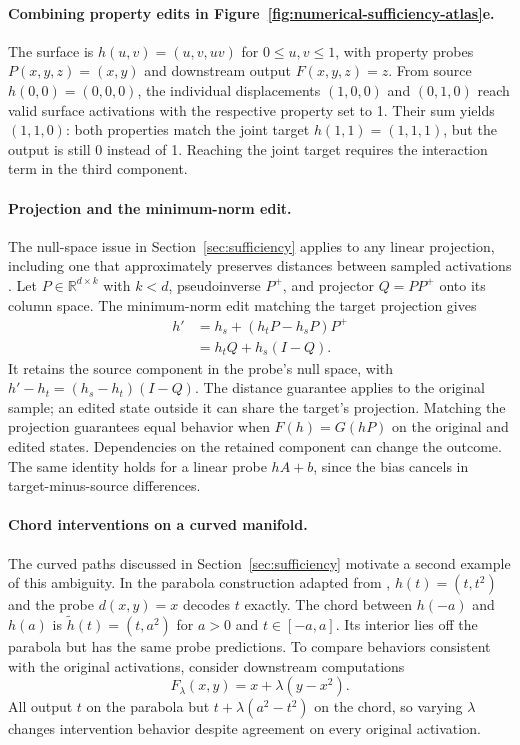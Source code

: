 \documentclass[11pt]{article}
\newcommand{\R}{\mathbb{R}}
\begin{document}
\paragraph{Combining property edits in Figure~\ref{fig:numerical-sufficiency-atlas}e.}
The surface is $h(u,v)=(u,v,uv)$ for $0\leq u,v\leq1$, with property probes $P(x,y,z)=(x,y)$ and downstream output $F(x,y,z)=z$.
From source $h(0,0)=(0,0,0)$, the individual displacements $(1,0,0)$ and $(0,1,0)$ reach valid surface activations with the respective property set to 1.
Their sum yields $(1,1,0)$: both properties match the joint target $h(1,1)=(1,1,1)$, but the output is still 0 instead of 1.
Reaching the joint target requires the interaction term in the third component.

\paragraph{Projection and the minimum-norm edit.}
The null-space issue in Section~\ref{sec:sufficiency} applies to any linear projection, including one that approximately preserves distances between sampled activations \citep{johnson1984extensions}.
Let $P\in\R^{d\times k}$ with $k<d$, pseudoinverse $P^+$, and projector $Q=PP^+$ onto its column space.
The minimum-norm edit matching the target projection gives
\begin{equation}
\begin{split}
h'&=h_s+(h_tP-h_sP)P^+\\
  &=h_tQ+h_s(I-Q).
\end{split}
\label{eq:projection-edit}
\end{equation}
It retains the source component in the probe's null space, with $h'-h_t=(h_s-h_t)(I-Q)$.
The distance guarantee applies to the original sample; an edited state outside it can share the target's projection.
Matching the projection guarantees equal behavior when $F(h)=G(hP)$ on the original and edited states.
Dependencies on the retained component can change the outcome.
The same identity holds for a linear probe $hA+b$, since the bias cancels in target-minus-source differences.

\paragraph{Chord interventions on a curved manifold.}
The curved paths discussed in Section~\ref{sec:sufficiency} motivate a second example of this ambiguity.
In the parabola construction adapted from \citet{wurgaft2026manifold}, $h(t)=(t,t^2)$ and the probe $d(x,y)=x$ decodes $t$ exactly.
The chord between $h(-a)$ and $h(a)$ is $\widetilde h(t)=(t,a^2)$ for $a>0$ and $t\in[-a,a]$.
Its interior lies off the parabola but has the same probe predictions.
To compare behaviors consistent with the original activations, consider downstream computations
\begin{equation}
F_\lambda(x,y)=x+\lambda(y-x^2).
\end{equation}
All output $t$ on the parabola but $t+\lambda(a^2-t^2)$ on the chord, so varying $\lambda$ changes intervention behavior despite agreement on every original activation.
\end{document}
